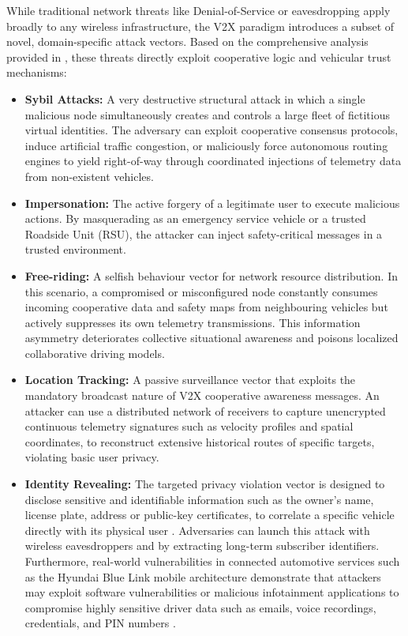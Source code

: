 While traditional network threats like Denial-of-Service or eavesdropping apply broadly to any wireless infrastructure, the V2X paradigm introduces a subset of novel, domain-specific attack vectors. Based on the comprehensive analysis provided in \cite{V2Xthreats}, these threats directly exploit cooperative logic and vehicular trust mechanisms:

\begin{itemize}
    \item \textbf{Sybil Attacks:} A very destructive structural attack in which a single malicious node simultaneously creates and controls a large fleet of fictitious virtual identities.  The adversary can exploit cooperative consensus protocols, induce artificial traffic congestion, or maliciously force autonomous routing engines to yield right-of-way through coordinated injections of telemetry data from non-existent vehicles.
    \item \textbf{Impersonation:} The active forgery of a legitimate user to execute malicious actions. By masquerading as an emergency service vehicle or a trusted Roadside Unit (RSU), the attacker can inject safety-critical messages in a trusted environment.
    \item \textbf{Free-riding:} A selfish behaviour vector for network resource distribution. In this scenario, a compromised or misconfigured node constantly consumes incoming cooperative data and safety maps from neighbouring vehicles but actively suppresses its own telemetry transmissions. This information asymmetry deteriorates collective situational awareness and poisons localized collaborative driving models.
    \item \textbf{Location Tracking:} A passive surveillance vector that exploits the mandatory broadcast nature of V2X cooperative awareness messages. An attacker can use a distributed network of receivers to capture unencrypted continuous telemetry signatures such as velocity profiles and spatial coordinates, to reconstruct extensive historical routes of specific targets, violating basic user privacy.
    \item \textbf{Identity Revealing:} The targeted privacy violation vector is designed to disclose sensitive and identifiable information such as the owner's name, license plate, address or public-key certificates, to correlate a specific vehicle directly with its physical user \cite{V2Xthreats}. Adversaries can launch this attack with wireless eavesdroppers and by extracting long-term subscriber identifiers. Furthermore, real-world vulnerabilities in connected automotive services such as the Hyundai Blue Link mobile architecture demonstrate that attackers may exploit software vulnerabilities or malicious infotainment applications to compromise highly sensitive driver data such as emails, voice recordings, credentials, and PIN numbers \cite{cisa2017hyundai}.
\end{itemize}

